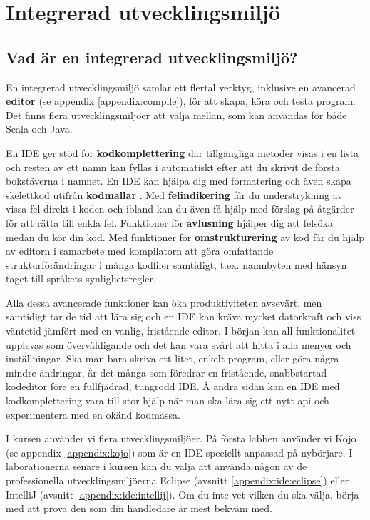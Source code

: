 
\chapter{Integrerad utvecklingsmiljö}\label{appendix:ide}

\section{Vad är en integrerad utvecklingsmiljö?}

En integrerad utvecklingsmiljö  samlar ett flertal verktyg, inklusive en avancerad \textbf{editor} (se appendix \ref{appendix:compile}), för att skapa, köra och testa program. Det finns flera utvecklingsmiljöer att välja mellan, som kan användas för både Scala och Java.

En IDE ger stöd för \textbf{kodkomplettering}  där tillgängliga metoder visas i en lista och resten av ett namn kan fyllas i automatiskt efter att du skrivit de första bokstäverna i namnet. En IDE kan hjälpa dig med formatering och även skapa skelettkod utifrån \textbf{kodmallar} . Med \textbf{felindikering}  får du understrykning av vissa fel direkt i koden och ibland kan du även få hjälp med förslag på åtgärder för att rätta till enkla fel. Funktioner för \textbf{avlusning}  hjälper dig att felsöka medan du kör din kod. Med funktioner för \textbf{omstrukturering}  av kod får du hjälp av editorn i samarbete med kompilatorn att göra omfattande strukturförändringar i många kodfiler samtidigt, t.ex. namnbyten med hänsyn taget till språkets synlighetsregler.

Alla dessa avancerade funktioner kan öka produktiviteten avsevärt, men samtidigt tar de tid att lära sig och en IDE kan kräva mycket datorkraft och viss väntetid jämfört med en vanlig, fristående editor. I början kan all funktionalitet upplevas som överväldigande och det kan vara svårt att hitta i alla menyer och inställningar. Ska man bara skriva ett litet, enkelt program, eller göra några mindre ändringar, är det många som föredrar en fristående, snabbstartad kodeditor före en fullfjädrad, tungrodd IDE. Å andra sidan kan en IDE med kodkomplettering vara till stor hjälp när man ska lära sig ett nytt api och experimentera med en okänd kodmassa.

I kursen använder vi flera utvecklingsmiljöer. På första labben använder vi Kojo (se appendix \ref{appendix:kojo}) som är en IDE speciellt anpassad på nybörjare. I laborationerna senare i kursen kan du välja att använda någon av de professionella utvecklingsmiljöerna Eclipse (avsnitt \ref{appendix:ide:eclipse}) eller IntelliJ (avsnitt \ref{appendix:ide:intellij}). Om du inte vet vilken du ska välja, börja med att prova den som din handledare är mest bekväm med.



